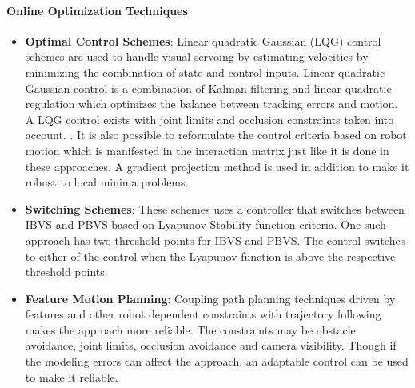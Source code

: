 \paragraph{Online Optimization Techniques}
\begin{itemize}
    \item \textbf{Optimal Control Schemes}: Linear quadratic Gaussian (LQG) control schemes are used to handle visual servoing by estimating velocities by minimizing the combination
    of state and control inputs\cite{hashimoto1993lq}. Linear quadratic Gaussian control is a combination of Kalman filtering and linear quadratic regulation which optimizes the balance between tracking errors and motion. A LQG control exists with joint limits and occlusion constraints taken into account. \cite{Nelson1995a}. It is also possible to reformulate the control criteria based on robot motion which is manifested in the interaction matrix just like it is done in these approaches\cite{Sharma1997,Nelson1995}. A
    gradient projection method is used in addition to make it robust to local minima problems\cite{Castano1994,Espiau1992}.
    
    \item \textbf{Switching Schemes}: These schemes uses a controller that switches between IBVS and PBVS based on Lyapunov Stability function criteria. One such approach \cite{Gans2003} has two threshold points for IBVS and PBVS. The control switches to either of the control when the Lyapunov function is above the respective threshold points.
    
    \item \textbf{Feature Motion Planning}: 
    Coupling path planning techniques driven by features and other robot dependent constraints with trajectory following makes the approach more reliable. The constraints may 
    be obstacle avoidance, joint limits, occlusion avoidance and camera visibility. Though if the modeling errors can affect the approach, an adaptable control can be used to
    make it reliable\cite{Chaumette2007}.
  
\end{itemize}




 
      
